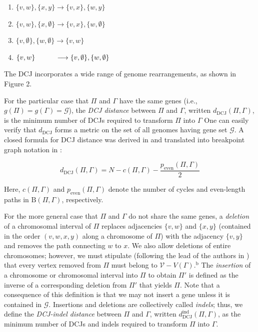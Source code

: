 \begin{enumerate}
\item $\{v, w\}, \{x, y\} \longrightarrow \{v, x\}, \{w, y\} $
\item $\{v, w\}, \{x, \emptyset\} \longrightarrow \{v, x\}, \{w, \emptyset\}$
\item $\{v, \emptyset\}, \{w, \emptyset\} \longrightarrow \{v, w\}$
\item $\{v, w\} \hspace{29 pt} \longrightarrow \{v, \emptyset\}, \{w, \emptyset\}$
\end{enumerate}
The DCJ incorporates a wide range of genome rearrangements, as shown in Figure 2.

For the particular case that $\Pi$ and $\Gamma$ have the same genes (i.e., $g(\Pi) = g(\Gamma) = \mathcal{G}$), the {\em DCJ distance} between $\Pi$ and $\Gamma$, written $d_{\mathrm{DCJ}}(\Pi, \Gamma)$, is the minimum number of DCJs required to transform $\Pi$ into $\Gamma$  One can easily verify that $d_{\mathrm{DCJ}}$ forms a metric on the set of all genomes having gene set $\mathcal{G}$.  A closed formula for DCJ distance was derived in \cite{bergeron} and translated into breakpoint graph notation in \cite{tannier}:

\begin{equation}
d_{\mathrm{DCJ}}(\Pi, \Gamma) = N - c(\Pi, \Gamma) - \frac{p_{\mathrm{even}}(\Pi, \Gamma)}{2}
\label{Equation: DCJ Closed Form}
\end{equation}

\noindent Here, $c(\Pi, \Gamma)$ and $p_{\mathrm{even}}(\Pi, \Gamma)$ denote the number of cycles and even-length paths in $\mathrm{B}(\Pi, \Gamma)$, respectively.

For the more general case that $\Pi$ and $\Gamma$ do not share the same genes, a {\em deletion} of a chromosomal interval of $\Pi$ replaces adjacencies $\{v, w\}$ and $\{x, y\}$ (contained in the order $(v, w, x, y)$ along a chromosome of $\Pi$) with the adjacency $\{v, y\}$ and removes the path connecting $w$ to $x$.  We also allow deletions of entire chromosomes; however, we must stipulate (following the lead of the authors in \cite{braga2010}) that every vertex removed from $\Pi$ must belong to $\mathcal{V} - V(\Gamma)$.$^\textrm{b}$ The {\em insertion} of a chromosome or chromosomal interval into $\Pi$ to obtain $\Pi'$ is defined as the inverse of a corresponding deletion from $\Pi'$ that yields $\Pi$.  Note that a consequence of this definition is that we may not insert a gene unless it is contained in $\mathcal{G}$. Insertions and deletions are collectively called {\em indels}; thus, we define the {\em DCJ-indel distance} between $\Pi$ and $\Gamma$, written $d_{\mathrm{DCJ}}^{\mathrm{ind}}(\Pi, \Gamma)$, as the minimum number of DCJs and indels required to transform $\Pi$ into $\Gamma$.

